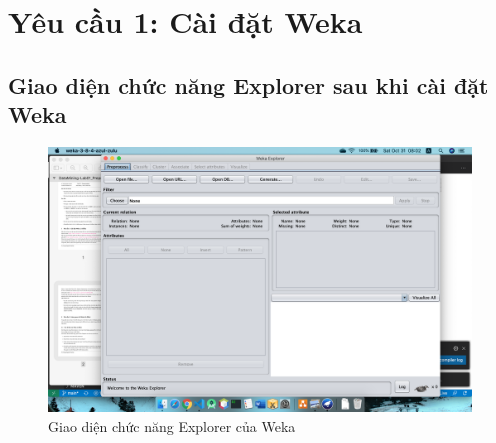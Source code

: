 \documentclass[a4paper, 12pt]{article}
\begin{document}
\clearpage

\section{Yêu cầu 1: Cài đặt Weka}
\subsection{Giao diện chức năng Explorer sau khi cài đặt Weka}
\begin{figure}[H]
    \begin{center}
        \includegraphics[scale = 0.35]{./images/wekw_explorer.png}
        \caption{Giao diện chức năng Explorer của Weka}
    \end{center}
\end{figure}
\end{document}
